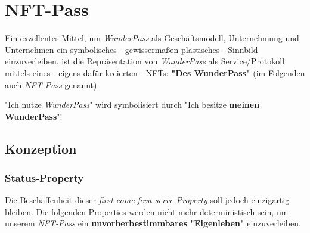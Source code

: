 
\section{NFT-Pass}
\label{sec:nft-pass}


Ein exzellentes Mittel, um \textit{WunderPass} als Geschäftsmodell, Unternehmung und Unternehmen ein symbolisches - gewissermaßen plastisches - Sinnbild einzuverleiben, ist die Repräsentation von \textit{WunderPass} als Service/Protokoll mittels eines - eigens dafür kreierten - NFTs: \textbf{"Des WunderPass"} (im Folgenden auch \textit{NFT-Pass} genannt)

\vspace{0.3cm}

\begin{Fazit}

"Ich nutze \textit{WunderPass}" wird symbolisiert durch "Ich besitze \textbf{meinen WunderPass}"!

\end{Fazit}

\vspace{0.3cm}


\subsection{Konzeption}
\vspace{0.3cm}



\subsubsection{Status-Property}
\vspace{0.2cm}


Die Beschaffenheit dieser \textit{first-come-first-serve-Property} soll jedoch einzigartig bleiben. Die folgenden Properties werden nicht mehr deterministisch sein, um unserem \textit{NFT-Pass} ein \textbf{unvorherbestimmbares "Eigenleben"} einzuverleiben. 


